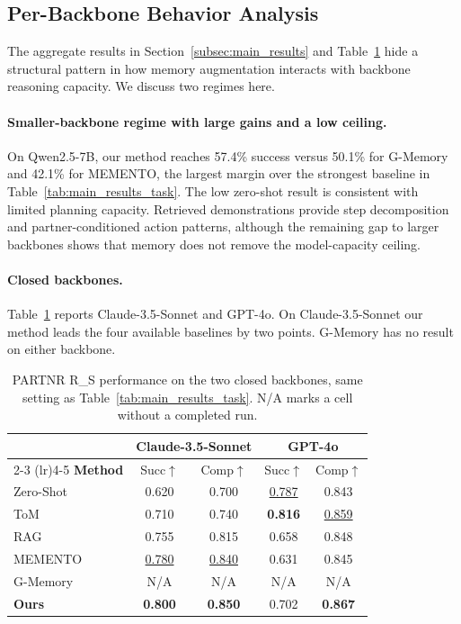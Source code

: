 \documentclass{article}
\theoremstyle{plain}
\theoremstyle{definition}
\theoremstyle{remark}
\begin{document}
\subsection{Per-Backbone Behavior Analysis}
\label{sec:per_backbone}

The aggregate results in Section~\ref{subsec:main_results} and Table~\ref{tab:closed_backbones} hide a structural pattern in how memory augmentation interacts with backbone reasoning capacity. We discuss two regimes here.

\paragraph{Smaller-backbone regime with large gains and a low ceiling.} On Qwen2.5-7B, our method reaches 57.4\% success versus 50.1\% for G-Memory and 42.1\% for MEMENTO, the largest margin over the strongest baseline in Table~\ref{tab:main_results_task}. The low zero-shot result is consistent with limited planning capacity. Retrieved demonstrations provide step decomposition and partner-conditioned action patterns, although the remaining gap to larger backbones shows that memory does not remove the model-capacity ceiling.

\paragraph{Closed backbones.} Table~\ref{tab:closed_backbones} reports Claude-3.5-Sonnet and GPT-4o. On Claude-3.5-Sonnet our method leads the four available baselines by two points. G-Memory has no result on either backbone.

\begin{table}[h]
\centering
\caption{PARTNR R\_S performance on the two closed backbones, same setting as Table~\ref{tab:main_results_task}. N/A marks a cell without a completed run.}
\label{tab:closed_backbones}
\small
\begin{tabular}{@{}l|cc|cc@{}}
\toprule
& \multicolumn{2}{c|}{\textbf{Claude-3.5-Sonnet}} & \multicolumn{2}{c}{\textbf{GPT-4o}} \\
\cmidrule(lr){2-3} \cmidrule(lr){4-5}
\textbf{Method} & Succ$\uparrow$ & Comp$\uparrow$ & Succ$\uparrow$ & Comp$\uparrow$ \\
\midrule
Zero-Shot & 0.620 & 0.700 & \underline{0.787} & 0.843 \\
ToM       & 0.710 & 0.740 & \textbf{0.816} & \underline{0.859} \\
RAG       & 0.755 & 0.815 & 0.658 & 0.848 \\
MEMENTO   & \underline{0.780} & \underline{0.840} & 0.631 & 0.845 \\
G-Memory  & N/A & N/A & N/A & N/A \\
\midrule
\textbf{Ours} & \textbf{0.800} & \textbf{0.850} & 0.702 & \textbf{0.867} \\
\bottomrule
\end{tabular}
\end{table}
\end{document}
